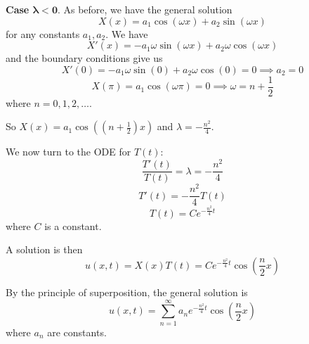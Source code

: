 \documentclass[plain]{pset}
\begin{document}
\begin{solution}
    \textbf{Case \(\mathbf{\lambda < 0}\)}.
    As before, we have the general solution
    \[X(x) = a_1\cos(\omega x) + a_2\sin(\omega x)\]
    for any constants \(a_1, a_2\).
    We have
    \[X'(x) = -a_1\omega\sin(\omega x) + a_2\omega\cos(\omega x)\]
    and the boundary conditions give us
    \[X'(0) = -a_1\omega\sin(0) + a_2\omega\cos(0) = 0 \implies a_2 = 0\]
    \[X(\pi) = a_1\cos(\omega\pi) = 0 \implies \omega = n + \frac{1}{2}\]
    where \(n = 0, 1, 2, \ldots.\)

    So \(X(x) = a_1\cos\left(\left(n + \frac{1}{2}\right)x\right)\) and \(\lambda = -\frac{n^2}{4}\).

    We now turn to the ODE for \(T(t)\):
    \[\frac{T'(t)}{T(t)} = \lambda = -\frac{n^2}{4}\]
    \[T'(t) = -\frac{n^2}{4}T(t)\]
    \[T(t) = Ce^{-\frac{n^2}{4}t}\]
    where \(C\) is a constant.

    A solution is then
    \[u(x, t) = X(x)T(t) = Ce^{-\frac{n^2}{4}t}\cos\left(\frac{n}{2}x\right)\]

    By the principle of superposition, the general solution is
    \[u(x, t) = \sum_{n=1}^\infty a_n e^{-\frac{n^2}{4}t}\cos\left(\frac{n}{2}x\right)\]
    where \(a_n\) are constants.

\end{solution}
\end{document}
